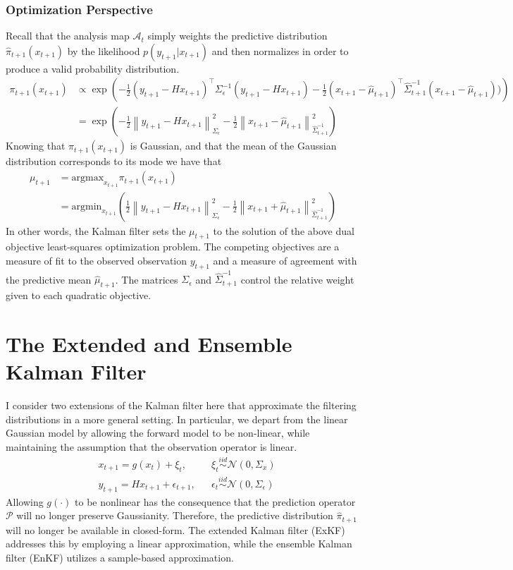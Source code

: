 \documentclass[12pt]{article}
\newcommand*{\norm}[1]{\left\lVert#1\right\rVert}
\begin{document}
\subsubsection{Optimization Perspective}
Recall that the analysis map $\mathcal{A}_{t}$ simply weights the predictive distribution $\hat{\pi}_{t+1}(x_{t+1})$ by the likelihood $p(y_{t+1}|x_{t+1})$ and then 
normalizes in order to produce a valid probability distribution. 
\begin{align*}
\pi_{t + 1}(x_{t + 1}) &\propto \exp\left(-\frac{1}{2} (y_{t+1} - Hx_{t+1})^{\top} \Sigma_\epsilon^{-1} (y_{t+1} - Hx_{t+1}) - \frac{1}{2} (x_{t+1} - \hat{\mu}_{t+1})^{\top} \hat{\Sigma}^{-1}_{t+1} (x_{t+1} - \hat{\mu}_{t+1}) ) \right) \\
			       &= \exp\left(-\frac{1}{2} \norm{y_{t+1} - Hx_{t+1}}^2_{\Sigma_\epsilon} - \frac{1}{2} \norm{x_{t+1} - \hat{\mu}_{t+1}}^2_{\hat{\Sigma}^{-1}_{t+1}} \right) 
\end{align*}
Knowing that $\pi_{t + 1}(x_{t + 1})$ is Gaussian, and that the mean of the Gaussian distribution corresponds to its mode we have that 
\begin{align*}
\mu_{t + 1} &= \text{argmax}_{x_{t+1}} \pi_{t+1}(x_{t+1}) \\
		  &= \text{argmin}_{x_{t+1}} \left( \frac{1}{2} \norm{y_{t+1} - Hx_{t+1}}^2_{\Sigma_\epsilon} - \frac{1}{2} \norm{x_{t+1} + \hat{\mu}_{t+1}}^2_{\hat{\Sigma}^{-1}_{t+1}} \right)
\end{align*}
In other words, the Kalman filter sets the $\mu_{t+1}$ to the solution of the above dual objective least-squares optimization problem. The competing objectives are a measure of fit 
to the observed observation $y_{t+1}$ and a measure of agreement with the predictive mean $\hat{\mu}_{t+1}$. The matrices $\Sigma_\epsilon$ and $\hat{\Sigma}^{-1}_{t+1}$
control the relative weight given to each quadratic objective. 


\section{The Extended and Ensemble Kalman Filter}
I consider two extensions of the Kalman filter here that approximate the filtering distributions in a more general setting. In particular, we depart from the linear 
Gaussian model by allowing the forward model to be non-linear, while maintaining the assumption that the observation operator is linear. 
\begin{align}
&x_{t + 1} = g(x_t) + \xi_t, && \xi_t \overset{iid}{\sim} \mathcal{N}(0, \Sigma_x) \\
&y_{t + 1} = Hx_{t+1} + \epsilon_{t+1}, && \epsilon_t \overset{iid}{\sim} \mathcal{N}(0, \Sigma_\epsilon) \nonumber 
\end{align}
Allowing $g(\cdot)$ to be nonlinear has the consequence that the prediction operator $\mathcal{P}$ will no longer preserve Gaussianity. Therefore, the predictive 
distribution $\hat{\pi}_{t+1}$ will no longer be available in closed-form. The extended Kalman filter (ExKF) addresses this by employing a linear approximation, while 
the ensemble Kalman filter (EnKF) utilizes a sample-based approximation. 
\end{document}
